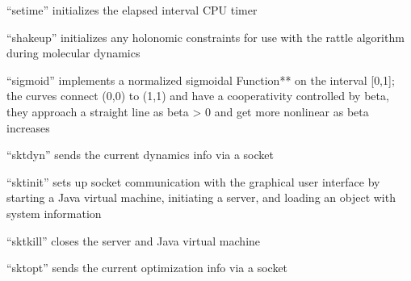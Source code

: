 \documentclass[letterpaper,11pt,english]{sphinxmanual}
\begin{document}





“setime” initializes the elapsed interval CPU timer











“shakeup” initializes any holonomic constraints for use with the rattle algorithm during molecular dynamics


“sigmoid” implements a normalized sigmoidal Function** on the interval {[}0,1{]}; the curves connect (0,0) to (1,1) and have a cooperativity controlled by beta, they approach a straight line as beta \sphinxhyphen{}\textgreater{} 0 and get more nonlinear as beta increases


“sktdyn” sends the current dynamics info via a socket


“sktinit” sets up socket communication with the graphical user interface by starting a Java virtual machine, initiating a server, and loading an object with system information


“sktkill” closes the server and Java virtual machine


“sktopt” sends the current optimization info via a socket
\end{document}
